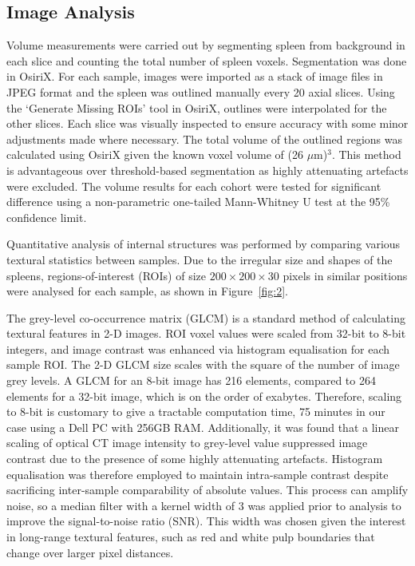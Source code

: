 	\subsection{Image Analysis}
	Volume measurements were carried out by segmenting spleen from background in each slice and counting the total number of spleen voxels. Segmentation was done in OsiriX. \cite{rossetosirix:2004}  For each sample, images were imported as a stack of image files in JPEG format and the spleen was outlined manually every 20 axial slices. Using the `Generate Missing ROIs' tool in OsiriX, outlines were interpolated for the other slices. Each slice was visually inspected to ensure accuracy with some minor adjustments made where necessary. The total volume of the outlined regions was calculated using OsiriX given the known voxel volume of (26 $\mu$m)$^3$. This method is advantageous over threshold-based segmentation as highly attenuating artefacts were excluded. The volume results for each cohort were tested for significant difference using a non-parametric one-tailed Mann-Whitney U test at the 95\% confidence limit.
	
	Quantitative analysis of internal structures was performed by comparing various textural statistics between samples. Due to the irregular size and shapes of the spleens, regions-of-interest (ROIs) of size $200 \times 200 \times 30$ pixels in similar positions were analysed for each sample, as shown in Figure~\ref{fig:2}. 
	
	The grey-level co-occurrence matrix (GLCM) is a standard method of calculating textural features in 2-D images. \cite{haralicktextural1973} ROI voxel values were scaled from 32-bit to 8-bit integers, and image contrast was enhanced via histogram equalisation for each sample ROI. The 2-D GLCM size scales with the square of the number of image grey levels. A GLCM for an 8-bit image has 216 elements, compared to 264 elements for a 32-bit image, which is on the order of exabytes. Therefore, scaling to 8-bit is customary to give a tractable computation time, 75 minutes in our case using a Dell PC with 256GB RAM. Additionally, it was found that a linear scaling of optical CT image intensity to grey-level value suppressed image contrast due to the presence of some highly attenuating artefacts. Histogram equalisation was therefore employed to maintain intra-sample contrast despite sacrificing inter-sample comparability of absolute values. This process can amplify noise, so a median filter with a kernel width of 3 was applied prior to analysis to improve the signal-to-noise ratio (SNR). This width was chosen given the interest in long-range textural features, such as red and white pulp boundaries that change over larger pixel distances.
	
